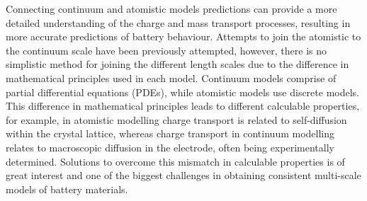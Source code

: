 \documentclass[aps,prb,twocolumn,superscriptaddress,reprint]{revtex4-1}
\begin{document}
Connecting continuum and atomistic models predictions can provide a more detailed understanding of the charge and mass transport processes, resulting in more accurate predictions of battery behaviour. Attempts to join the atomistic to the continuum scale have been previously attempted, however, there is no simplistic method for joining the different length scales due to the difference in mathematical principles used in each model.\cite{Fackeldey2015} Continuum models comprise of partial differential equations (PDEs), while atomistic models use discrete models.\cite{Badia2007} This difference in mathematical principles leads to different calculable properties, for example, in atomistic modelling charge transport is related to self-diffusion within the crystal lattice, whereas charge transport in continuum modelling relates to macroscopic diffusion in the electrode, often being experimentally determined. Solutions to overcome this mismatch in calculable properties is of great interest and one of the biggest challenges in obtaining consistent multi-scale models of battery materials.


\end{document}
